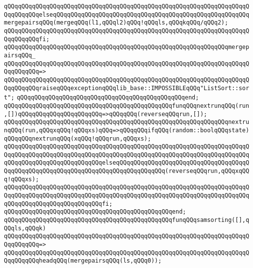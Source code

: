 \verb|qQQqqQQqqQQqqQQqqQQqqQQqqQQqqQQqqQQqqQQqqQQqqQQqqQQqqQQqqQQqqQQqqQQqqQQqqQQqqQQqelseqQQqqQQqqQQqqQQqqQQqqQQqqQQqqQQqqQQqqQQqqQQqqQQqqQQqqQQqmergepairsqQQq(mergeqQQq(l1,qQQql2)qQQq!qQQqls,qQQqkqQQq/qQQq2);|\newline
\verb|qQQqqQQqqQQqqQQqqQQqqQQqqQQqqQQqqQQqqQQqqQQqqQQqqQQqqQQqqQQqqQQqqQQqqQQqqQQqqQQqfi;|\newline
\newline
\verb|qQQqqQQqqQQqqQQqqQQqqQQqqQQqqQQqqQQqqQQqqQQqqQQqqQQqqQQqqQQqqQQqmergepairsqQQq_|\newline
\verb|qQQqqQQqqQQqqQQqqQQqqQQqqQQqqQQqqQQqqQQqqQQqqQQqqQQqqQQqqQQqqQQqqQQqqQQqqQQqqQQq=>|\newline
\verb|qQQqqQQqqQQqqQQqqQQqqQQqqQQqqQQqqQQqqQQqqQQqqQQqqQQqqQQqqQQqqQQqqQQqqQQqqQQqqQQqraiseqQQqexceptionqQQqlib_base::IMPOSSIBLEqQQq"ListSort::sort";|\newline
\verb|qQQqqQQqqQQqqQQqqQQqqQQqqQQqqQQqqQQqqQQqqQQqqQQqend;|\newline
\newline
\verb|qQQqqQQqqQQqqQQqqQQqqQQqqQQqqQQqqQQqqQQqqQQqqQQqfunqQQqnextrunqQQq(run,[])qQQqqQQqqQQqqQQqqQQqqQQq=>qQQqqQQq(reverseqQQqrun,[]);|\newline
\verb|qQQqqQQqqQQqqQQqqQQqqQQqqQQqqQQqqQQqqQQqqQQqqQQqqQQqqQQqqQQqqQQqnextrunqQQq(run,qQQqxqQQq!qQQqxs)qQQq=>qQQqqQQqifqQQq(random::boolqQQqstate)qQQqqQQqnextrunqQQq(xqQQq!qQQqrun,qQQqxs);|\newline
\verb|qQQqqQQqqQQqqQQqqQQqqQQqqQQqqQQqqQQqqQQqqQQqqQQqqQQqqQQqqQQqqQQqqQQqqQQqqQQqqQQqqQQqqQQqqQQqqQQqqQQqqQQqqQQqqQQqqQQqqQQqqQQqqQQqqQQqqQQqqQQqqQQqqQQqqQQqqQQqqQQqqQQqqQQqelseqQQqqQQqqQQqqQQqqQQqqQQqqQQqqQQqqQQqqQQqqQQqqQQqqQQqqQQqqQQqqQQqqQQqqQQqqQQqqQQqqQQq(reverseqQQqrun,qQQqxqQQq!qQQqxs);|\newline
\verb|qQQqqQQqqQQqqQQqqQQqqQQqqQQqqQQqqQQqqQQqqQQqqQQqqQQqqQQqqQQqqQQqqQQqqQQqqQQqqQQqqQQqqQQqqQQqqQQqqQQqqQQqqQQqqQQqqQQqqQQqqQQqqQQqqQQqqQQqqQQqqQQqqQQqqQQqqQQqqQQqqQQqqQQqfi;|\newline
\verb|qQQqqQQqqQQqqQQqqQQqqQQqqQQqqQQqqQQqqQQqqQQqqQQqend;|\newline
\newline
\verb|qQQqqQQqqQQqqQQqqQQqqQQqqQQqqQQqqQQqqQQqqQQqqQQqfunqQQqsamsorting([],qQQqls,qQQqk)|\newline
\verb|qQQqqQQqqQQqqQQqqQQqqQQqqQQqqQQqqQQqqQQqqQQqqQQqqQQqqQQqqQQqqQQqqQQqqQQqqQQqqQQq=>|\newline
\verb|qQQqqQQqqQQqqQQqqQQqqQQqqQQqqQQqqQQqqQQqqQQqqQQqqQQqqQQqqQQqqQQqqQQqqQQqqQQqqQQqheadqQQq(mergepairsqQQq(ls,qQQq0));|\newline
